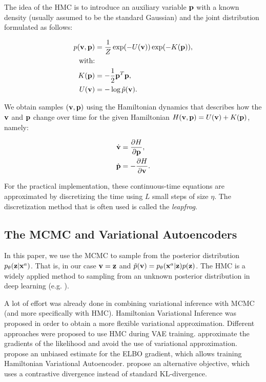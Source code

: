 The idea of the HMC is to introduce an auxiliary variable ${\mathbf{p}}$ with a known density (usually assumed to be the standard Gaussian) and the joint distribution formulated as follows: 

\begin{align}\label{eq:hmc}
p(\rvv, \rvp) &= \frac{1}{Z}\exp(-U(\rvv)) \exp(-K(\rvp)),   \\
\text{with:}& \notag\\
K(\rvp) &= - \frac{1}{2}\rvp^T\rvp, \\
U(\rvv) &= -\log \tilde{p}(\rvv). 
\end{align}

We obtain samples $({\mathbf{v}}, {\mathbf{p}})$ using the Hamiltonian dynamics \cite{neal2011mcmc} that describes how the ${\mathbf{v}}$ and ${\mathbf{p}}$ change over time for the given Hamiltonian $H({\mathbf{v}}, {\mathbf{p}}) = U({\mathbf{v}}) + K({\mathbf{p}})$, namely:

\begin{align}
\dot{{\mathbf{v}}} &= \frac{\partial H}{\partial {\mathbf{p}}},\\
\dot{{\mathbf{p}}} &= - \frac{\partial H}{\partial {\mathbf{v}}}.
\end{align}

For the practical implementation, these continuous-time equations are approximated by discretizing the time using $L$ small steps of size $\eta$. The discretization method that is often used is called the \textit{leapfrog}.

\subsection{The MCMC and Variational Autoencoders}
In this paper, we use the MCMC to sample from the posterior distribution $p_{\theta}({\mathbf{z}}|{\mathbf{x}}^a)$. That is, in our case ${\mathbf{v}} = {\mathbf{z}}$ and $ \tilde{p}({\mathbf{v}}) = p_{\theta}({\mathbf{x}}^a|{\mathbf{z}})p({\mathbf{z}})$. The HMC is a widely applied method to sampling from an unknown posterior distribution in deep learning (e.g. \citet{izmailov2021bayesian}). 

A lot of effort was already done in combining variational inference with MCMC (and more specifically with HMC). Hamiltonian Variational Inference \cite{salimans2015markov, wolf2016variational} was proposed in order to obtain a more flexible variational approximation. Different approaches were proposed to use HMC during VAE training. \citet{hoffman2017learning} approximate the gradients of the likelihood and avoid the use of variational approximation. \citet{caterini2018hamiltonian} propose an unbiased estimate for the ELBO gradient, which allows training Hamiltonian Variational Autoencoder. \citet{ruiz2019contrastive} propose an alternative objective, which uses a contrastive divergence instead of standard KL-divergence. 

